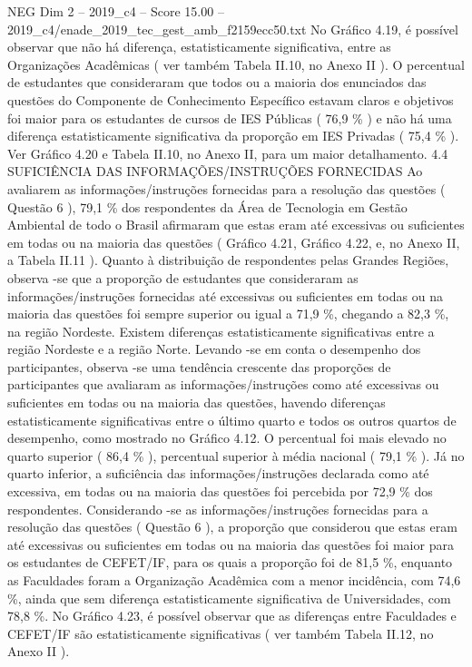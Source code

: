 \begin{textsample}{NEG Dim 2 – 2019\_c4 – Score 15.00 – 2019\_c4/enade\_2019\_tec\_gest\_amb\_f2159ecc50.txt}
No Gráfico 4.19, é possível observar que não há diferença, estatisticamente significativa, entre as Organizações Acadêmicas ( ver também Tabela II.10, no Anexo II ).
O percentual de estudantes que consideraram que todos ou a maioria dos enunciados das questões do Componente de Conhecimento Específico estavam claros e objetivos foi maior para os estudantes de cursos de IES Públicas ( 76,9 \% ) e não há uma diferença estatisticamente significativa da proporção em IES Privadas ( 75,4 \% ).
Ver Gráfico 4.20 e Tabela II.10, no Anexo II, para um maior detalhamento. 4.4 SUFICIÊNCIA DAS INFORMAÇÕES/INSTRUÇÕES FORNECIDAS Ao avaliarem as informações/instruções fornecidas para a resolução das questões ( Questão 6 ), 79,1 \% dos respondentes da Área de Tecnologia em Gestão Ambiental de todo o Brasil afirmaram que estas eram até excessivas ou suficientes em todas ou na maioria das questões ( Gráfico 4.21, Gráfico 4.22, e, no Anexo II, a Tabela II.11 ).
Quanto à distribuição de respondentes pelas Grandes Regiões, observa -se que a proporção de estudantes que consideraram as informações/instruções fornecidas até excessivas ou suficientes em todas ou na maioria das questões foi sempre superior ou igual a 71,9 \%, chegando a 82,3 \%, na região Nordeste.
Existem diferenças estatisticamente significativas entre a região Nordeste e a região Norte.
Levando -se em conta o desempenho dos participantes, observa -se uma tendência crescente das proporções de participantes que avaliaram as informações/instruções como até excessivas ou suficientes em todas ou na maioria das questões, havendo diferenças estatisticamente significativas entre o último quarto e todos os outros quartos de desempenho, como mostrado no Gráfico 4.12.
O percentual foi mais elevado no quarto superior ( 86,4 \% ), percentual superior à média nacional ( 79,1 \% ).
Já no quarto inferior, a suficiência das informações/instruções declarada como até excessiva, em todas ou na maioria das questões foi percebida por 72,9 \% dos respondentes.
Considerando -se as informações/instruções fornecidas para a resolução das questões ( Questão 6 ), a proporção que considerou que estas eram até excessivas ou suficientes em todas ou na maioria das questões foi maior para os estudantes de CEFET/IF, para os quais a proporção foi de 81,5 \%, enquanto as Faculdades foram a Organização Acadêmica com a menor incidência, com 74,6 \%, ainda que sem diferença estatisticamente significativa de Universidades, com 78,8 \%.
No Gráfico 4.23, é possível observar que as diferenças entre Faculdades e CEFET/IF são estatisticamente significativas ( ver também Tabela II.12, no Anexo II ).

\end{textsample}
